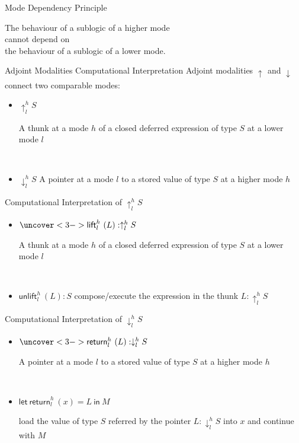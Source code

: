 \documentclass[letterpaper,12pt,aspectratio=169,show notes,dvipsnames]{beamer}
\newcommand{\tyUp}[3]{{\uparrow^{#1}_{#2} #3}}
\newcommand{\tyDown}[3]{{\downarrow^{#1}_{#2} #3}}
\newcommand{\tmLiftName}{{\mathsf{lift}}}
\newcommand{\tmLift}[3]{{\tmLiftName^{#1}_{#2}\ (#3)}}
\newcommand{\tmUnliftName}{{\mathsf{unlift}}}
\newcommand{\tmUnlift}[3]{{\tmUnliftName^{#1}_{#2}\ (#3)}}
\newcommand{\tmReturnName}{{\mathsf{return}}}
\newcommand{\tmReturn}[3]{{\tmReturnName^{#1}_{#2}\ (#3)}}
\newcommand{\tmLetreturnName}{{\mathsf{let}\ \mathsf{return}}}
\newcommand{\tmLetreturn}[5]{{\tmLetreturnName^{#1}_{#2}\ (#3) = #4\ \mathsf{in}\ #5}}
\begin{document}
\begin{frame}{Mode Dependency Principle}
  \color{black}
  \begin{center}
	The behaviour of a sublogic of {\color{violet}a higher mode}\\cannot depend on\\the behaviour of a sublogic of {\color{violet}a lower mode}.
  \end{center}
\end{frame}

\begin{frame}{Adjoint Modalities \textemdash Computational Interpretation}
  \color{black}
  Adjoint modalities \(\tyUp{}{}{}\) and \(\tyDown{}{}{}\) connect two comparable modes:
  \pause
  \begin{itemize}[<+->]
  \item \(\tyUp{h}{l}{S}\) \textemdash{} \parbox{25em}{A thunk at a mode \(h\) of a closed deferred expression of type \(S\) at a lower mode \(l\)}\\[1em]
  \item \(\tyDown{h}{l}{S}\) \textemdash{} A pointer at a mode \(l\) to a stored value of type \(S\) at a higher mode \(h\)
  \end{itemize}
\end{frame}

\begin{frame}{Computational Interpretation of \(\tyUp{h}{l}{S}\)}
  \color{black}
  \pause
  \begin{itemize}
  \item<2-> \(\uncover<3->{\tmLift{h}{l}{L} : }\tyUp{h}{l}{S}\) \textemdash{} \parbox{22em}{A thunk at a mode \(h\) of a closed deferred expression  of type \(S\) at a lower mode \(l\)}\\[1em]
  \item<4-> \(\tmUnlift{h}{l}{L} : S\) \textemdash{} compose/execute the expression in the thunk \(L : \tyUp{h}{l}{S}\)
  \end{itemize}
\end{frame}

\begin{frame}{Computational Interpretation of \(\tyDown{h}{l}{S}\)}
  \color{black}
  \pause
  \begin{itemize}
  \item<2-> \(\uncover<3->{\tmReturn{h}{l}{L} : }\tyDown{h}{l}{S}\) \textemdash{} \parbox{18em}{A pointer at a mode \(l\) to a stored value  of type \(S\) at a higher mode \(h\)}\\[1em]
  \item<4-> \(\tmLetreturn{h}{l}{x}{L}{M}\) \textemdash{} \parbox{19em}{load the value of type \(S\) referred by the pointer \(L : \tyDown{h}{l}{S}\) into \(x\) and continue with \(M\)}
  \end{itemize}
\end{frame}
\end{document}
